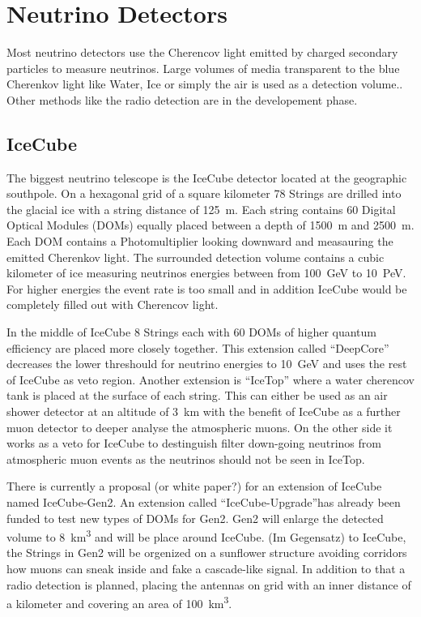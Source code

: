 \section{Neutrino Detectors}

Most neutrino detectors use the  Cherencov light emitted by charged secondary particles to measure neutrinos.
Large volumes of media transparent to the blue Cherenkov light like Water, Ice or simply the air is used as a detection volume..
Other methods like the radio detection are in the developement phase.

\subsection{IceCube}

The biggest neutrino telescope is the IceCube detector located at the geographic southpole.
On a hexagonal grid of a square kilometer 78 Strings are drilled into the glacial ice with a string distance of \SI{125}{m}.
Each string contains \num{60} Digital Optical Modules (DOMs) equally placed between a depth of \SI{1500}{m} and \SI{2500}{m}.
Each DOM contains a Photomultiplier looking downward and measauring the emitted Cherenkov light.
The surrounded detection volume contains a cubic kilometer of ice measuring neutrinos energies between from \SI{100}{GeV} to \SI{10}{PeV}.
For higher energies the event rate is too small and in addition IceCube would be completely filled out with Cherencov light.

In the middle of IceCube 8 Strings each with 60 DOMs of higher quantum efficiency are placed more closely together.
This extension called \enquote{DeepCore} decreases the lower threshould for neutrino energies to \SI{10}{GeV} and uses the rest of IceCube as veto region.
Another extension is \enquote{IceTop} where a water cherencov tank is placed at the surface of each string.
This can either be used as an air shower detector at an altitude of \SI{3}{km} with the benefit of IceCube as a further muon detector to deeper analyse the atmospheric muons.
On the other side it works as a veto for IceCube to destinguish filter down-going neutrinos from atmospheric muon events as the neutrinos should not be seen in IceTop.

There is currently a proposal (or white paper?) for an extension of IceCube named IceCube-Gen2.
An extension called \enquote{IceCube-Upgrade}has already been funded to test new types of DOMs for Gen2.
Gen2 will enlarge the detected volume to \SI{8}{\cubic\kilo\meter} and will be place around IceCube.
(Im Gegensatz) to IceCube, the Strings in Gen2 will be orgenized on a sunflower structure avoiding corridors how muons can sneak inside and fake a cascade-like signal.
In addition to that a radio detection is planned, placing the antennas on grid with an inner distance of a kilometer and covering an area of \SI{100}{\cubic\kilo\meter}.

